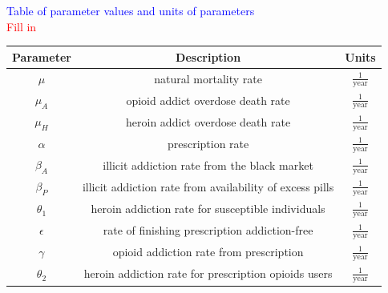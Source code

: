 \documentclass[12pt]{article}
\begin{document}
\textcolor{blue}{Table of parameter values and units of parameters} \\
\textcolor{red}{Fill in}


\begin{center}
 \setlength\extrarowheight{6pt}
\begin{tabular}{|c | c | c | }

 \hline

{Parameter} & {Description} & {Units} \\ [0.5ex]

 \hline\hline
 
 $\mu$ &  natural mortality rate & $\frac{1}{\text{year}}$ \\

 \hline

 $\mu_A$ & opioid addict overdose death rate & $\frac{1}{\text{year}}$\\

 \hline
 
 $\mu_H$ &  heroin addict overdose death rate & $\frac{1}{\text{year}}$ \\

 \hline

$\alpha$ &  prescription rate & $\frac{1}{\text{year}}$    \\

 \hline

$\beta_A$ & illicit addiction rate from the black market & $\frac{1}{\text{year}}$  \\

\hline

$\beta_P$ &  illicit addiction rate from availability of excess pills & $\frac{1}{\text{year}}$  \\

\hline

$\theta_1$&  heroin addiction rate for susceptible individuals & $\frac{1}{\text{year}}$   \\

\hline

$\epsilon$ &  rate of finishing prescription addiction-free & $\frac{1}{\text{year}}$ \\

\hline

$\gamma$ &  opioid addiction rate from prescription & $\frac{1}{\text{year}}$ \\

\hline

$\theta_2$ &  heroin addiction rate for prescription opioids users & $\frac{1}{\text{year}}$  \\


\end{tabular}
\end{center}
\end{document}
